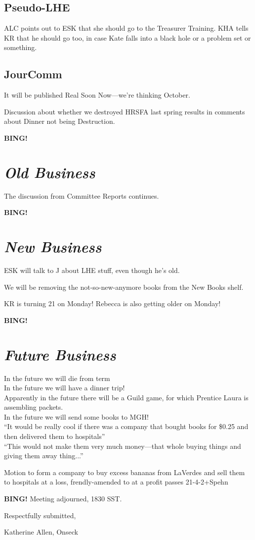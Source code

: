 \documentclass[10pt]{article}
\newcommand{\bing}{{\bf BING!} }
\newcommand{\goto}[1]{\bing \vskip 12pt \section*{{\em{#1}}}}
\begin{document}
\subsection{Pseudo-LHE}
ALC points out to ESK that she should go to the Treasurer Training.
KHA tells KR that he should go too, in case Kate falls into a black
hole or a problem set or something.

\subsection*{JourComm}
It will be published Real Soon Now---we're thinking October.

Discussion about whether we destroyed HRSFA last spring results in
comments about Dinner not being Destruction.

\goto{Old Business}

The discussion from Committee Reports continues.

\goto{New Business}
 ESK will talk to J about LHE stuff, even though he's old.

We will be removing the not-so-new-anymore books from the New
Books shelf.

KR is turning 21 on Monday!
Rebecca is also getting older on Monday!

\goto{Future Business}
In the future we will die from term\\
In the future we will have a dinner trip!\\
Apparently in the future there will be a Guild game, for which Prentice
Laura is assembling packets.\\
In the future we will send some books to MGH!\\

``It would be really cool if there was a company that bought books for
\$0.25 and then delivered them to hospitals''\\
``This would not make them very much money---that whole buying things
and giving them away thing...''

Motion to form a company to buy excess bananas from LaVerdes and sell
them to hospitals at a loss, frendly-amended to at a profit passes 21-4-2+Spehn


\bing
\noindent
Meeting adjourned, 1830 SST.

\vspace{18pt}

\centerline{Respectfully submitted,}
\centerline{Katherine Allen, Onseck}
\end{document}
